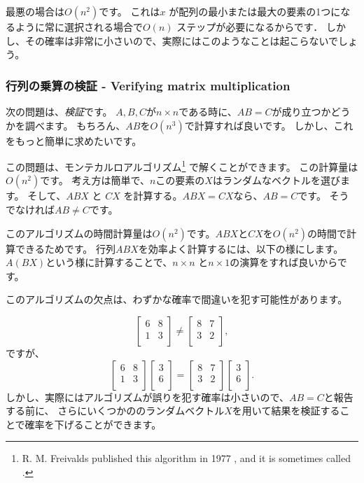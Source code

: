 最悪の場合は$O(n^2)$です。
これは$x$ が配列の最小または最大の要素の1つになるように常に選択される場合で$O(n)$ ステップが必要になるからです．
しかし、その確率は非常に小さいので、実際にはこのようなことは起こらないでしょう。

\subsubsection{行列の乗算の検証 - Verifying matrix multiplication}



次の問題は、\emph{検証}です。
$A,B,C$が$n \times n$である時に、$AB=C$が成り立つかどうかを調べます。
もちろん、$AB$を$O(n^3)$で計算すれば良いです。
しかし、これをもっと簡単に求めたいです。

この問題は、モンテカルロアルゴリズム\footnote{R. M. Freivalds published
this algorithm in 1977 \cite{fre77}, and it is sometimes
called  .}
で解くことができます。
この計算量は$O(n^2)$です。
考え方は簡単で、$n$この要素の$X$はランダムなベクトルを選びます。
そして、$ABX$ と $CX$ を計算する。$ABX=CX$なら、$AB=C$です。
そうでなければ$AB \neq C$です。

このアルゴリズムの時間計算量は$O(n^2)$です。$ABX$と$CX$を$O(n^2)$の時間で計算できるためです。
行列$ABX$を効率よく計算するには、以下の様にします。
$A(BX)$という様に計算することで、$n \times n$ と$n \times 1$の演算をすれば良いからです。

このアルゴリズムの欠点は、わずかな確率で間違いを犯す可能性があります。

\[
 \begin{bmatrix}
  6 & 8 \\
  1 & 3 \\
 \end{bmatrix}
\neq
 \begin{bmatrix}
  8 & 7 \\
  3 & 2 \\
 \end{bmatrix},
\]
ですが、
\[
 \begin{bmatrix}
  6 & 8 \\
  1 & 3 \\
 \end{bmatrix}
 \begin{bmatrix}
  3 \\
  6 \\
 \end{bmatrix}
=
 \begin{bmatrix}
  8 & 7 \\
  3 & 2 \\
 \end{bmatrix}
 \begin{bmatrix}
  3 \\
  6 \\
 \end{bmatrix}.
\]
しかし、実際にはアルゴリズムが誤りを犯す確率は小さいので、$AB=C$と報告する前に、
さらにいくつかののランダムベクトル$X$を用いて結果を検証することで確率を下げることができます。

